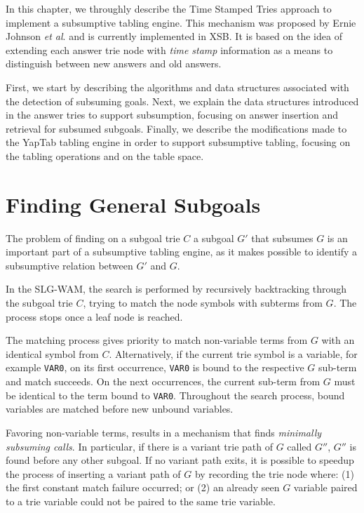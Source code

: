 In this chapter, we throughly describe the Time Stamped Tries approach
to implement a subsumptive tabling engine. This mechanism was proposed by
Ernie Johnson \textit{et al}. \cite{Johnson-99} and is currently implemented in XSB.
It is based on the idea of extending each answer trie node with \textit{time stamp}
information as a means to distinguish between new answers and old answers.

First, we start by describing the algorithms and data structures associated
with the detection of subsuming goals. Next, we explain the data structures
introduced in the answer tries to support subsumption, focusing on answer insertion
and retrieval for subsumed subgoals. Finally, we describe the modifications made to the YapTab
tabling engine in order to support subsumptive tabling, focusing on the tabling operations
and on the table space.

\section{Finding General Subgoals}\label{sec:lookup_subsuming}

The problem of finding on a subgoal trie $C$ a subgoal $G'$ that subsumes $G$ 
is an important part of a subsumptive tabling engine, as it makes possible to
identify a subsumptive relation between $G'$ and $G$.

In the SLG-WAM, the search is performed by recursively backtracking through the subgoal trie $C$, trying
to match the node symbols with subterms from $G$. The process stops once a leaf node is reached.

The matching process gives priority to match non-variable terms from $G$
with an identical symbol from $C$.
Alternatively, if the current trie symbol is a variable, for example \texttt{VAR0}, on its first occurrence, \texttt{VAR0}
is bound to the respective $G$ sub-term
and match succeeds. On the next occurrences, the current sub-term from $G$ must
be identical to the term bound to \texttt{VAR0}. Throughout the search process, bound variables are
matched before new unbound variables.

Favoring non-variable terms, results in a mechanism that finds \textit{minimally subsuming calls}.
In particular, if there is a variant trie path of $G$ called $G''$, $G''$ is found before any other subgoal.
If no variant path exits, it is possible to speedup the process of inserting a variant path of $G$
by recording the trie node where: (1) the first constant match
failure occurred; or (2) an already seen $G$ variable paired to a trie variable could
not be paired to the same trie variable.

